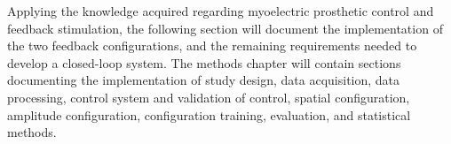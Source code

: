 

Applying the knowledge acquired regarding myoelectric prosthetic control and feedback stimulation, the following section will document the implementation of the two feedback configurations, and the remaining requirements needed to develop a closed-loop system. The methods chapter will contain sections documenting the implementation of study design, data acquisition, data processing, control system and validation of control, spatial configuration, amplitude configuration, configuration training, evaluation, and statistical methods.      